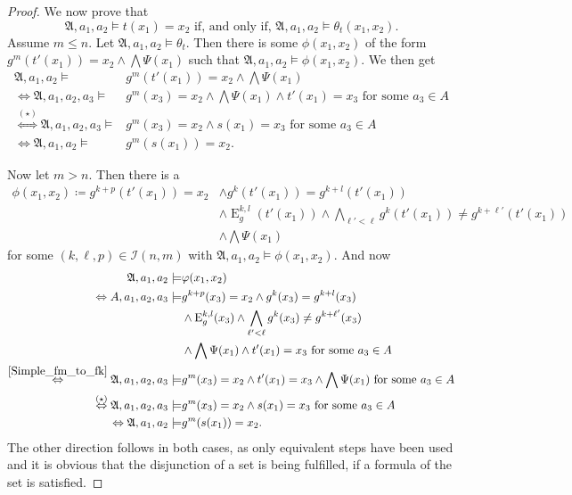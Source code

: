 \begin{proof}
	We now prove that 
	$$\mathfrak A, a_1,a_2\models t(x_1)=x_2 \text{ if, and only if, } \mathfrak A,a_1,a_2\models \theta_{t}(x_1,x_2).$$
	Assume $m\leq n$.
	Let $\mathfrak A, a_1,a_2 \models \theta_{t}$.
	Then there is some $\phi(x_1,x_2)$ of the form $g^{m}(t'(x_1))=x_2 \land \bigwedge \Psi(x_1)$ such that $\mathfrak A,a_1,a_2\models \phi(x_1,x_2)$.
	We then get
	\begin{align*}
		\mathfrak A,a_1,a_2 \models & g^{m}(t'(x_1))=x_2 \land \bigwedge \Psi(x_1) \\
		\Leftrightarrow \mathfrak A,a_1,a_2,a_3 \models & g^{m}(x_3)=x_2 \land \bigwedge \Psi(x_1) \land t'(x_1)=x_3 \text{ for some } a_3\in A \\
		\overset{(\star)}{\Leftrightarrow} \mathfrak A,a_1,a_2,a_3\models & g^{m}(x_3)=x_2 \land s(x_1)=x_3 \text{ for some } a_3\in A \\
		\Leftrightarrow \mathfrak A,a_1,a_2 \models & g^{m}(s(x_1))=x_2.
	\end{align*}
	
	Now let $m>n$.
	Then there is a
	\begin{align*}
		\phi(x_1,x_2)\coloneqq g^{k+p}(t'(x_1))=x_2 &\land g^{k}(t'(x_1))=g^{k+l}(t'(x_1)) \\
		& \land \operatorname{E}^{k,l}_g(t'(x_1)) \land \bigwedge_{\ell'<\ell} g^{k}(t'(x_1))\neq g^{k+\ell'}(t'(x_1)) \\
		& \land \bigwedge \Psi(x_1)
	\end{align*}
	for some $(k,\ell,p)\in\mathcal I(n,m)$ with $\mathfrak A,a_1,a_2\models \phi(x_1,x_2)$.
	And now
	\begin{align*}
		\mathfrak A,a_1,a_2 \models & \phi(x_1,x_2) \\
		\Leftrightarrow A,a_1,a_2,a_3 \models &g^{k+p}(x_3)=x_2 \land g^{k}(x_3)=g^{k+l}(x_3) \\
		& \land \operatorname{E}^{k,l}_g(x_3) \land \bigwedge_{\ell'<\ell} g^{k}(x_3)\neq g^{k+\ell'}(x_3) \\
		& \land \bigwedge\Psi(x_1) \land t'(x_1)=x_3 \text{ for some } a_3\in A \\
		\overset{\ref{Simple_fm_to_fk}}{\Leftrightarrow} \mathfrak A, a_1,a_2,a_3 \models & g^{m}(x_3)=x_2 \land t'(x_1)=x_3 \land \bigwedge\Psi(x_1) \text{ for some } a_3 \in A \\
		\overset{(\star)}{\Leftrightarrow} \mathfrak A,a_1,a_2,a_3 \models & g^{m}(x_3)=x_2\land s(x_1)=x_3 \text{ for some } a_3\in A \\
		\Leftrightarrow \mathfrak A,a_1,a_2 \models & g^{m}(s(x_1))=x_2.
	\end{align*}
	The other direction follows in both cases, as only equivalent steps have been used and it is obvious that the disjunction of a set is being fulfilled, if a formula of the set is satisfied.
	

\end{proof}
